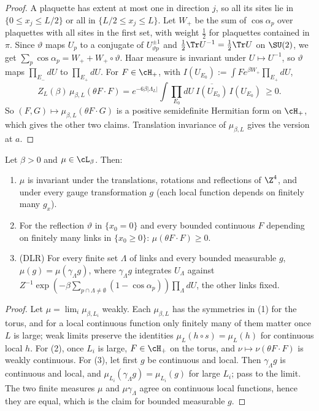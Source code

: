 \begin{proof}
A plaquette has extent at most one in direction $j$, so all its sites lie in $\{0\le x_j\le L/2\}$ or all in $\{L/2\le x_j\le L\}$. Let $W_+$ be the sum of $\cos\alpha_p$ over plaquettes with all sites in the first set, with weight $\tfrac12$ for plaquettes contained in $\pi$. Since $\vartheta$ maps $U_p$ to a conjugate of $U_{\vartheta p}^{\pm1}$ and $\tfrac12\Tr U^{-1}=\tfrac12\Tr U$ on $\SU(2)$, we get $\sum_p\cos\alpha_p=W_++W_+\circ\vartheta$. Haar measure is invariant under $U\mapsto U^{-1}$, so $\vartheta$ maps $\prod_{E_-}dU$ to $\prod_{E_+}dU$. For $F\in\cH_+$, with $I(U_{E_0}):=\int F e^{\beta W_+}\prod_{E_+}dU$,
\[
Z_L(\beta)\,\mu_{\beta,L}(\theta F\cdot F)=e^{-6\beta|\Lambda_L|}\int\prod_{E_0}dU\ \overline{I(U_{E_0})}\,I(U_{E_0})\ \ge0 .
\]
So $(F,G)\mapsto\mu_{\beta,L}(\theta F\cdot G)$ is a positive semidefinite Hermitian form on $\cH_+$, which gives the other two claims. Translation invariance of $\mu_{\beta,L}$ gives the version at $a$.
\end{proof}

\begin{lemma}\label{pf:lem-limit}
Let $\beta>0$ and $\mu\in\cL_\beta$. Then:
\begin{enumerate}
\item $\mu$ is invariant under the translations, rotations and reflections of $\Z^4$, and under every gauge transformation $g$ (each local function depends on finitely many $g_x$).
\item For the reflection $\vartheta$ in $\{x_0=0\}$ and every bounded continuous $F$ depending on finitely many links in $\{x_0\ge0\}$: $\mu(\theta F\cdot F)\ge0$.
\item (DLR) For every finite set $\Lambda$ of links and every bounded measurable $g$, $\mu(g)=\mu(\gamma_\Lambda g)$, where $\gamma_\Lambda g$ integrates $U_\Lambda$ against $Z^{-1}\exp(-\beta\sum_{p\cap\Lambda\ne\emptyset}(1-\cos\alpha_p))\prod_\Lambda dU$, the other links fixed.
\end{enumerate}
\end{lemma}

\begin{proof}
Let $\mu=\lim_i\mu_{\beta,L_i}$ weakly. Each $\mu_{\beta,L}$ has the symmetries in (1) for the torus, and for a local continuous function only finitely many of them matter once $L$ is large; weak limits preserve the identities $\mu_L(h\circ s)=\mu_L(h)$ for continuous local $h$. For (2), once $L_i$ is large, $F\in\cH_+$ on the torus, and $\nu\mapsto\nu(\theta F\cdot F)$ is weakly continuous. For (3), let first $g$ be continuous and local. Then $\gamma_\Lambda g$ is continuous and local, and $\mu_{L_i}(\gamma_\Lambda g)=\mu_{L_i}(g)$ for large $L_i$; pass to the limit. The two finite measures $\mu$ and $\mu\gamma_\Lambda$ agree on continuous local functions, hence they are equal, which is the claim for bounded measurable $g$.
\end{proof}

